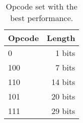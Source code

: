 \begin{table}
	\centering
	\begin{tabular}{lr}
		Opcode & Length \\
		\hline
		0 & 1 bits \\
		100 & 7 bits \\
		110 & 14 bits \\
		101 & 20 bits \\
		111 & 29 bits
	\end{tabular}
		

	\caption{Opcode set with the best performance.}
	\label{tab:results-opcode-decodeTable}
\end{table}